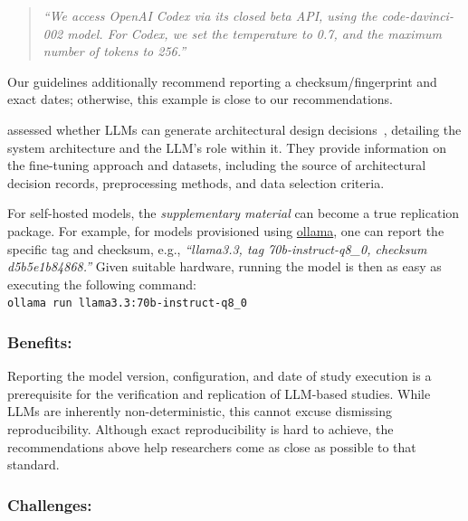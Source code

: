 \documentclass[smallextended]{svjour3}
\newcommand{\supplementarymaterial}{\emph{supplementary material}\xspace}
\newcommand{\supplementarymaterial}{\emph{supplementary material}\xspace}
\newcommand{\guidelinesubsubsection}[1]{\subsubsection{\bfseries #1:}}
\newcommand{\guidelinesubsubsection}[1]{\subsubsection{#1}}
\begin{document}
\begin{quote}
\it
``We access OpenAI Codex via its closed beta API, using the code-davinci-002 model. For Codex, we set the temperature to 0.7, and the maximum number of tokens to 256.''
\end{quote}

Our guidelines additionally recommend reporting a checksum/fingerprint and exact dates; otherwise, this example is close to our recommendations.

\citeauthor{DBLP:conf/icsa/DharVV24} assessed whether LLMs can generate architectural design decisions~\cite{DBLP:conf/icsa/DharVV24}, detailing the system architecture and the LLM's role within it.
They provide information on the fine-tuning approach and datasets, including the source of architectural decision records, preprocessing methods, and data selection criteria.

For self-hosted models, the \supplementarymaterial can become a true replication package. For example, for models provisioned using \href{https://ollama.com/library/}{ollama}, one can report the specific tag and checksum, e.g., \emph{``llama3.3, tag 70b-instruct-q8\_0, checksum d5b5e1b84868.''}
Given suitable hardware, running the model is then as easy as executing the following command:\\
\texttt{ollama run llama3.3:70b-instruct-q8\_0}

\guidelinesubsubsection{Benefits}

Reporting the model version, configuration, and date of study execution is a prerequisite for the verification and replication of LLM-based studies. While LLMs are inherently non-deterministic, this cannot excuse dismissing reproducibility. Although exact reproducibility is hard to achieve, the recommendations above help researchers come as close as possible to that standard.

\guidelinesubsubsection{Challenges}
\end{document}
